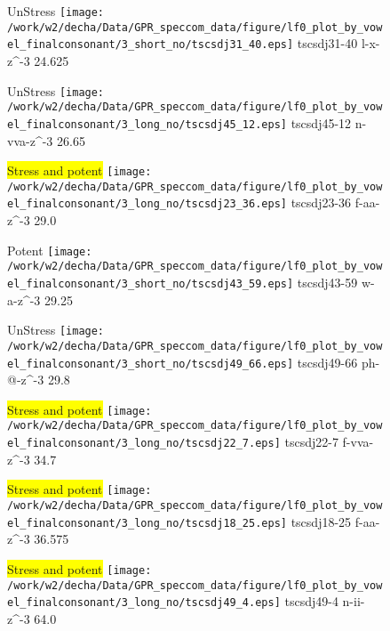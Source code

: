 \documentclass{article}
\begin{document}
\begin{figure}[t]
\begin{minipage}[b]{.24\textwidth}
UnStress
\centering
\texttt{[image: /work/w2/decha/Data/GPR\_speccom\_data/figure/lf0\_plot\_by\_vowel\_finalconsonant/3\_short\_no/tscsdj31\_40.eps]}
tscsdj31-40 l-x-z\textasciicircum-3 24.625
\end{minipage}
\begin{minipage}[b]{.24\textwidth}
UnStress
\centering
\texttt{[image: /work/w2/decha/Data/GPR\_speccom\_data/figure/lf0\_plot\_by\_vowel\_finalconsonant/3\_long\_no/tscsdj45\_12.eps]}
tscsdj45-12 n-vva-z\textasciicircum-3 26.65
\end{minipage}
\begin{minipage}[b]{.24\textwidth}
\colorbox{yellow}{Stress and potent}
\centering
\texttt{[image: /work/w2/decha/Data/GPR\_speccom\_data/figure/lf0\_plot\_by\_vowel\_finalconsonant/3\_long\_no/tscsdj23\_36.eps]}
tscsdj23-36 f-aa-z\textasciicircum-3 29.0
\end{minipage}
\begin{minipage}[b]{.24\textwidth}
\colorbox{Apricot}{Potent}
\centering
\texttt{[image: /work/w2/decha/Data/GPR\_speccom\_data/figure/lf0\_plot\_by\_vowel\_finalconsonant/3\_short\_no/tscsdj43\_59.eps]}
tscsdj43-59 w-a-z\textasciicircum-3 29.25
\end{minipage}
\end{figure}

\begin{figure}[t]
\begin{minipage}[b]{.24\textwidth}
UnStress
\centering
\texttt{[image: /work/w2/decha/Data/GPR\_speccom\_data/figure/lf0\_plot\_by\_vowel\_finalconsonant/3\_short\_no/tscsdj49\_66.eps]}
tscsdj49-66 ph-@-z\textasciicircum-3 29.8
\end{minipage}
\begin{minipage}[b]{.24\textwidth}
\colorbox{yellow}{Stress and potent}
\centering
\texttt{[image: /work/w2/decha/Data/GPR\_speccom\_data/figure/lf0\_plot\_by\_vowel\_finalconsonant/3\_long\_no/tscsdj22\_7.eps]}
tscsdj22-7 f-vva-z\textasciicircum-3 34.7
\end{minipage}
\begin{minipage}[b]{.24\textwidth}
\colorbox{yellow}{Stress and potent}
\centering
\texttt{[image: /work/w2/decha/Data/GPR\_speccom\_data/figure/lf0\_plot\_by\_vowel\_finalconsonant/3\_long\_no/tscsdj18\_25.eps]}
tscsdj18-25 f-aa-z\textasciicircum-3 36.575
\end{minipage}
\begin{minipage}[b]{.24\textwidth}
\colorbox{yellow}{Stress and potent}
\centering
\texttt{[image: /work/w2/decha/Data/GPR\_speccom\_data/figure/lf0\_plot\_by\_vowel\_finalconsonant/3\_long\_no/tscsdj49\_4.eps]}
tscsdj49-4 n-ii-z\textasciicircum-3 64.0
\end{minipage}
\end{figure}
\end{document}
